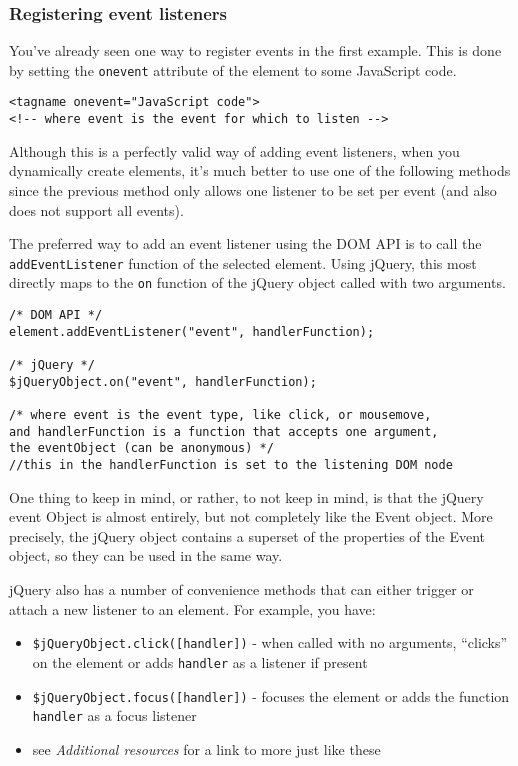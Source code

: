 \documentclass[12pt]{article}
\begin{document}
\subsubsection*{Registering event listeners}
You've already seen one way to register events in the first example. This is done by setting the \texttt{onevent} attribute of the element to some JavaScript code.
\begin{Verbatim}[frame=single]
<tagname onevent="JavaScript code">
<!-- where event is the event for which to listen -->
\end{Verbatim}
Although this is a perfectly valid way of adding event listeners, when you dynamically create elements, it's much better to use one of the following methods since the previous method only allows one listener to be set per event (and also does not support all events).
\par
The preferred way to add an event listener using the DOM API is to call the \texttt{addEventListener} function of the selected element. Using jQuery, this most directly maps to the \texttt{on} function of the jQuery object called with two arguments.
\begin{Verbatim}[frame=single]
/* DOM API */
element.addEventListener("event", handlerFunction);

/* jQuery */
$jQueryObject.on("event", handlerFunction);

/* where event is the event type, like click, or mousemove,
and handlerFunction is a function that accepts one argument,
the eventObject (can be anonymous) */
//this in the handlerFunction is set to the listening DOM node
\end{Verbatim}
One thing to keep in mind, or rather, to not keep in mind, is that the jQuery event Object is almost entirely, but not completely like the Event object. More precisely, the jQuery object contains a superset of the properties of the Event object, so they can be used in the same way.
\par
jQuery also has a number of convenience methods that can either trigger or attach a new listener to an element. For example, you have:
\begin{itemize}
\item \texttt{\$jQueryObject.click([handler])} - when called with no arguments, ``clicks'' on the element or adds \texttt{handler} as a listener if present
\item \texttt{\$jQueryObject.focus([handler])} - focuses the element or adds the function \texttt{handler} as a focus listener
\item see \emph{Additional resources} for a link to more just like these
\end{itemize}
\end{document}
